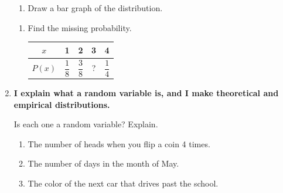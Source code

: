 \documentclass[11pt]{article}
\newcommand{\goal}[1]{\textbf{#1}\par\vspace{0.35em}}
\newcommand{\blankbars}[5]{%
  \def\pbmax{#1}\probbars{#2}{#3}{0.1}{#4}%
  \ifkey\foreach \x/\p in {#5} \draw[keyred,thick,fill=red!12] (\x-0.35,0) rectangle (\x+0.35,\p);\fi}
\begin{document}
\begin{enumerate}
\begin{minipage}[t]{0.47\linewidth}
\begin{enumerate}[start=5,itemsep=1em]
\end{enumerate}
\end{minipage}\hfill
\begin{minipage}[t]{0.5\linewidth}\vspace{0pt}\raggedright
\begin{enumerate}[start=8]
  \item Draw a bar graph of the distribution.

  \vspace{0.5em}
\end{enumerate}
\end{minipage}

\vspace{1.2em}
\begin{enumerate}[start=9]
  \item Find the missing probability.

  \vspace{0.3em}
  {\renewcommand{\arraystretch}{2.2}\begin{tabular}{|c|c|c|c|c|}\hline $x$ & 1 & 2 & 3 & 4\\ \hline $P(x)$ & $\dfrac{1}{8}$ & $\dfrac{3}{8}$ & \;?\; & $\dfrac{1}{4}$\\ \hline\end{tabular}}
  \qquad {}
  \work{3em}
\end{enumerate}

\newpage
\item \goal{I explain what a random variable is, and I make theoretical and empirical distributions.}
Is each one a random variable? Explain.
\begin{enumerate}[itemsep=1em]
  \item The number of heads when you flip a coin 4 times.

  \work{1.5em}
  \item The number of days in the month of May.

  \work{1.5em}
  \item The color of the next car that drives past the school.


\end{enumerate}
\end{enumerate}
\end{document}
